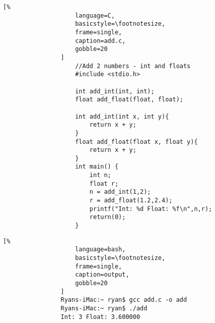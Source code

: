 \documentclass[crop=false,class=book]{standalone}
\begin{document}
            \begin{minipage}[t]{.48\textwidth}
                \centering
                \begin{lstlisting}[%
                    language=C,
                    basicstyle=\footnotesize,
                    frame=single,
                    caption=add.c,
                    gobble=20
                ]
                    //Add 2 numbers - int and floats
                    #include <stdio.h>
                    
                    int add_int(int, int);
                    float add_float(float, float);
                    
                    int add_int(int x, int y){
                        return x + y;
                    }
                    float add_float(float x, float y){
                        return x + y;
                    }
                    int main() {
                        int n;
                        float r;
                        n = add_int(1,2);
                        r = add_float(1.2,2.4);
                        printf("Int: %d Float: %f\n",n,r);
                        return(0);
                    }
                \end{lstlisting}
            \end{minipage}\hfill
            \begin{minipage}[t]{.48\textwidth}
                \centering
                \begin{lstlisting}[%
                    language=bash,
                    basicstyle=\footnotesize,
                    frame=single,
                    caption=output,
                    gobble=20
                ]
                Ryans-iMac:~ ryan$ gcc add.c -o add
                Ryans-iMac:~ ryan$ ./add
                Int: 3 Float: 3.600000
                \end{lstlisting}
            \end{minipage}
\end{document}
